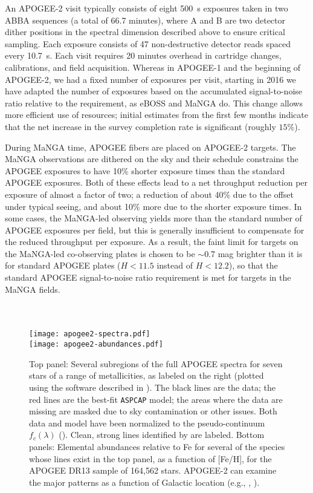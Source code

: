 An APOGEE-2 visit typically consists of eight 500~s exposures taken
in two ABBA sequences (a total of 66.7 minutes), where A and B are two
detector dither positions in the spectral dimension described above to
ensure critical sampling. Each exposure consists of 47 non-destructive
detector reads spaced every 10.7~s.  Each visit requires 20 minutes
overhead in cartridge changes, calibrations, and field acquisition.
Whereas in APOGEE-1 and the beginning of APOGEE-2, we had a fixed
number of exposures per visit, starting in 2016 we have adapted the
number of exposures based on the accumulated signal-to-noise ratio
relative to the requirement, as eBOSS and MaNGA do. This change allows
more efficient use of resources; initial estimates from the first few
months indicate that the net increase in the survey completion rate is
significant (roughly $15\%$).

During MaNGA time, APOGEE fibers are placed on APOGEE-2 targets.  The
MaNGA observations are dithered on the sky and their schedule
constrains the APOGEE exposures to have 10\% shorter exposure times
than the standard APOGEE exposures. Both of these effects lead to a
net throughput reduction per exposure of almost a factor of two; a
reduction of about 40\% due to the offset under typical seeing, and
about 10\% more due to the shorter exposure times. In some cases, the
MaNGA-led observing yields more than the standard number of APOGEE
exposures per field, but this is generally insufficient to compensate
for the reduced throughput per exposure. As a result, the faint limit
for targets on the MaNGA-led co-observing plates is chosen to be
$\sim$0.7 mag brighter than it is for standard APOGEE plates ($H<11.5$
instead of $H<12.2$), so that the standard APOGEE signal-to-noise
ratio requirement is met for targets in the MaNGA fields.

\begin{figure*}[t!]
\centering
~\\
~\\
\texttt{[image: apogee2-spectra.pdf]}
~\\
\texttt{[image: apogee2-abundances.pdf]}
\caption{ \label{fig:apogee2-data} Top panel: Several subregions of
  the full APOGEE spectra for seven stars of a range of metallicities,
  as labeled on the right (plotted using the software described in
  \citealt{bovy16b}). The black lines are the data; the red lines are
  the best-fit {\tt ASPCAP} model; the areas where the data are
  missing are masked due to sky contamination or other issues. Both
  data and model have been normalized to the pseudo-continuum
  $f_c(\lambda)$ (\citealt{holtzman15a}). Clean, strong lines
  identified by \citet{smith13a} are labeled.  Bottom panels:
  Elemental abundances relative to Fe for several of the species whose
  lines exist in the top panel, as a function of [Fe/H], for the
  APOGEE DR13 sample of 164,562 stars. APOGEE-2 can examine the major
  patterns as a function of Galactic location (e.g.,
  \citealt{nidever14a}, \citealt{hayden15a}).  \\ ~\\ ~\\ }
\end{figure*}


